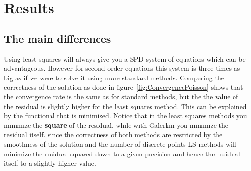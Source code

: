 
\chapter{Results} %

\label{chap:results} %


\section{The main differences}
Using least squares will always give you a SPD system of equations which can be advantageous. However for second order equations this system is three times as big as if we were to solve it using more standard methods. Comparing the correctness of the solution as done in figure~\ref{fig:ConvergencePoisson} shows that the convergence rate is the same as for standard methods, but the the value of the residual is slightly higher for the least squares method. This can be explained by the functional that is minimized. Notice that in the least squares methods you minimize the \textbf{square} of the residual, while with Galerkin you minimize the residual itself. since the correctness of both methods are restricted by the smoothness of the solution and the number of discrete points LS-methods will minimize the residual squared down to a given precision and hence the residual itself to a slightly higher value. 
\newpage
